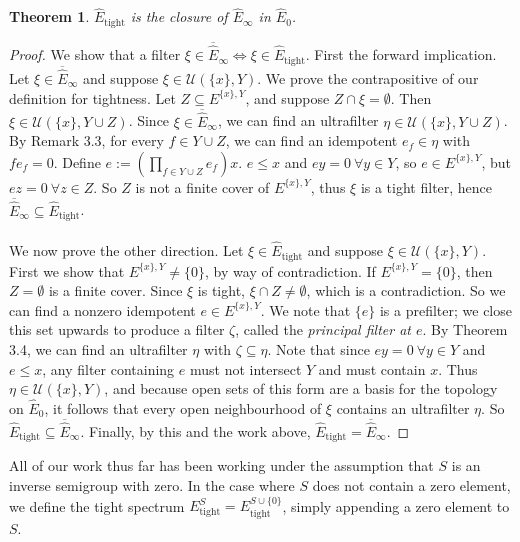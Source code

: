 \documentclass[12pt]{article}
\newtheorem{theorem}{Theorem}[section]
\theoremstyle{definition}
\begin{document}
\begin{theorem} $\hat{E}_{\text{tight}}$ is the closure of $\hat{E}_\infty$ in $\hat{E}_0$. \end{theorem}
\begin{proof}
    We show that a filter $\xi \in \overline{\hat{E}}_\infty \iff \xi \in \hat{E}_{\text{tight}}$. First
    the forward implication. Let $\xi \in \overline{\hat{E}}_\infty$ and suppose $\xi \in \mathcal{U}(\{x\}, Y)$.
    We prove the contrapositive of our definition for tightness. Let $Z \subseteq E^{\{x\}, Y}$, and suppose $Z \cap \xi = \emptyset$.
    Then $\xi \in \mathcal{U}(\{x\}, Y \cup Z)$. Since $\xi \in \overline{\hat{E}}_\infty$, we can find an ultrafilter
    $\eta \in \mathcal{U}(\{x\}, Y \cup Z)$. By Remark 3.3, for every $f \in Y \cup Z$, we can find an idempotent $e_f \in \eta$
    with $f e_f = 0$. Define $e := \left( \prod_{f \in Y \cup Z} e_f \right) x$. $e \leq x$ and $ey = 0 \ \forall y \in Y$, so
    $e \in E^{\{x\}, Y}$, but $ez = 0 \ \forall z \in Z$. So $Z$ is not a finite cover of $E^{\{x\}, Y}$, thus $\xi$ is a tight filter,
    hence $\overline{\hat{E}}_\infty \subseteq \hat{E}_{\text{tight}}$. 
    \\ \\
    We now prove the other direction. Let $\xi \in \hat{E}_{\text{tight}}$ and suppose $\xi \in \mathcal{U}(\{x\}, Y)$.
    First we show that $E^{\{x\}, Y} \neq \{0\}$, by way of contradiction. If $E^{\{x\}, Y} = \{0\}$, then $Z = \emptyset$ is a finite cover.
    Since $\xi$ is tight, $\xi \cap Z \neq \emptyset$, which is a contradiction. So we can find a nonzero idempotent $e \in E^{\{x\}, Y}$.
    We note that $\{e\}$ is a prefilter; we close this set upwards to produce a filter $\zeta$, called the \emph{principal filter at $e$}.
    By Theorem 3.4, we can find an ultrafilter $\eta$ with $\zeta \subseteq \eta$. Note that since 
    $ey = 0 \ \forall y \in Y$ and $e \leq x$, any filter containing $e$ must not intersect $Y$ and must contain $x$.
    Thus $\eta \in \mathcal{U}(\{x\}, Y)$, and because open sets of this form are a basis for the topology on $\hat{E}_0$,
    it follows that every open neighbourhood of $\xi$ contains an ultrafilter $\eta$. So $\hat{E}_\text{tight} \subseteq \overline{\hat{E}}_\infty$.
    Finally, by this and the work above, $\hat{E}_\text{tight} = \overline{\hat{E}}_\infty$.
\end{proof}

All of our work thus far has been working under the assumption that $S$ is an inverse
semigroup with zero. In the case where $S$ does not contain a zero element, we define 
the tight spectrum $E_\text{tight}^S = E_\text{tight}^{S \cup \{0\}}$, simply appending
a zero element to $S$.
\end{document}
